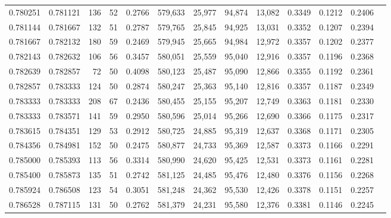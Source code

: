 \begin{tabular}{rrrrrrrrrrrrr}
0.780251 & 0.781121 &    136 &    52 &                                     0.2766 & 579,633 &  25,977 &  94,874 &  13,082 & 0.3349 & 0.1212 & 0.2406 \\
0.781144 & 0.781667 &    132 &    51 &                                     0.2787 & 579,765 &  25,845 &  94,925 &  13,031 & 0.3352 & 0.1207 & 0.2394 \\
0.781667 & 0.782132 &    180 &    59 &                                     0.2469 & 579,945 &  25,665 &  94,984 &  12,972 & 0.3357 & 0.1202 & 0.2377 \\
0.782143 & 0.782632 &    106 &    56 &                                     0.3457 & 580,051 &  25,559 &  95,040 &  12,916 & 0.3357 & 0.1196 & 0.2368 \\
0.782639 & 0.782857 &     72 &    50 &                                     0.4098 & 580,123 &  25,487 &  95,090 &  12,866 & 0.3355 & 0.1192 & 0.2361 \\
0.782857 & 0.783333 &    124 &    50 &                                     0.2874 & 580,247 &  25,363 &  95,140 &  12,816 & 0.3357 & 0.1187 & 0.2349 \\
0.783333 & 0.783333 &    208 &    67 &                                     0.2436 & 580,455 &  25,155 &  95,207 &  12,749 & 0.3363 & 0.1181 & 0.2330 \\
0.783333 & 0.783571 &    141 &    59 &                                     0.2950 & 580,596 &  25,014 &  95,266 &  12,690 & 0.3366 & 0.1175 & 0.2317 \\
0.783615 & 0.784351 &    129 &    53 &                                     0.2912 & 580,725 &  24,885 &  95,319 &  12,637 & 0.3368 & 0.1171 & 0.2305 \\
0.784356 & 0.784981 &    152 &    50 &                                     0.2475 & 580,877 &  24,733 &  95,369 &  12,587 & 0.3373 & 0.1166 & 0.2291 \\
0.785000 & 0.785393 &    113 &    56 &                                     0.3314 & 580,990 &  24,620 &  95,425 &  12,531 & 0.3373 & 0.1161 & 0.2281 \\
0.785400 & 0.785873 &    135 &    51 &                                     0.2742 & 581,125 &  24,485 &  95,476 &  12,480 & 0.3376 & 0.1156 & 0.2268 \\
0.785924 & 0.786508 &    123 &    54 &                                     0.3051 & 581,248 &  24,362 &  95,530 &  12,426 & 0.3378 & 0.1151 & 0.2257 \\
0.786528 & 0.787115 &    131 &    50 &                                     0.2762 & 581,379 &  24,231 &  95,580 &  12,376 & 0.3381 & 0.1146 & 0.2245 \\

\end{tabular}
